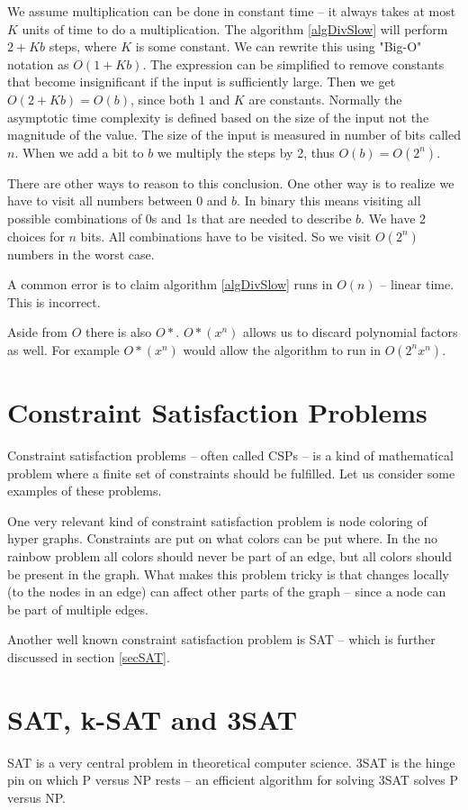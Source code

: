 \documentclass[msc,lith,english]{liuthesis}
\begin{document}
We assume multiplication can be done in constant time -- it always takes at most $K$ units of time to do a multiplication.
The algorithm \ref{algDivSlow} will perform $ 2 + Kb $ steps, where $K$ is some
constant. We can rewrite this using "Big-O" notation as $O(1 + Kb)$. The expression can be
simplified to remove constants that become insignificant if the
input is sufficiently large. Then we get $O(2 + Kb) = O(b)$, since both $1$ and $K$ are constants. 
Normally the asymptotic time complexity is defined based on the size of the input not the magnitude of the value.
The size of the input is measured in number of bits called $n$. When we add a bit to $b$ we multiply the steps by 2,
thus $O(b) = O(2^n)$.

There are other ways to reason to this conclusion.
One other way is to realize we have to visit all numbers between $0$ and $b$.
In binary this means visiting all possible combinations of 0s and 1s that are needed to describe $b$.
We have 2 choices for $n$ bits. All combinations have to be visited. So we visit $O(2^n)$ numbers in the worst case.
\cite[Chapter 3]{sourceAlgoBook}

A common error is to claim algorithm \ref{algDivSlow} runs in $O(n)$ -- linear time. This is incorrect.

Aside from $O$ there is also $O*$. $O*(x^n)$ allows us to discard polynomial factors as well. For example $O*(x^n)$ would allow the algorithm to run in $O(2^nx^n)$.

\section{Constraint Satisfaction Problems}
Constraint satisfaction problems -- often called CSPs -- is a kind of mathematical problem where a finite set of constraints should be fulfilled. Let us consider some examples of these problems.

One very relevant kind of constraint satisfaction problem is node coloring of hyper graphs.
Constraints are put on what colors can be put where. In the no rainbow problem all colors should never be part of an edge, but all colors should be present in the graph. What makes this problem tricky is that changes locally (to the nodes in an edge) can affect other parts of the graph -- since a node can be part of multiple edges.

Another well known constraint satisfaction problem is SAT -- which is further discussed in section \ref{secSAT}.

\section{SAT, k-SAT and 3SAT}
SAT is a very central problem in theoretical computer science. 3SAT is the
hinge pin on which P versus NP rests -- an efficient algorithm for solving 3SAT
solves P versus NP.
\end{document}
